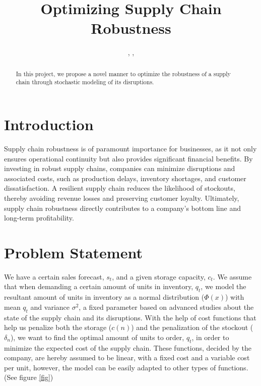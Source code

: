 \documentclass{OptiFlow}
\begin{document}

\title{Optimizing Supply Chain Robustness}

\author{, , }

\address{
}

\begin{abstract}
In this project, we propose a novel manner to optimize the robustness of a supply chain through stochastic modeling of its disruptions.
\end{abstract}

\maketitle

\section{Introduction}\label{sec1}
Supply chain robustness is of paramount importance for businesses, as it not only ensures operational continuity 
but also provides significant financial benefits. By investing in robust supply chains, 
companies can minimize disruptions and associated costs, such as production delays, inventory shortages, 
and customer dissatisfaction. A resilient supply chain reduces the likelihood of stockouts, thereby avoiding revenue losses and preserving customer loyalty. 
Ultimately, supply chain robustness directly contributes to a company's bottom line and long-term profitability.

\vspace{5mm}

\section{Problem Statement}\label{sec2}
We have a certain sales forecast, $s_t$, and a given storage capacity, $c_t$.
We assume that when demanding a certain amount of units in inventory, $q_t$, we model the resultant amount of units in inventory
as a normal distribution ($\Phi\left( x \right) $) with mean $q_t$ and variance $\sigma^2$, a fixed parameter based on advanced studies about the state of the supply chain and its disruptions.
With the help of cost functions that help us penalize both the storage ($c\left( n \right) $) and the penalization of the stockout ($\delta_n$), we want to find the optimal amount of units to order, $q_t$, in order to minimize the expected cost of the supply chain.
These functions, decided by the company, are hereby assumed to be linear, with a fixed cost and a variable cost per unit, however,
the model can be easily adapted to other types of functions. (See figure \ref{fig})
\end{document}
